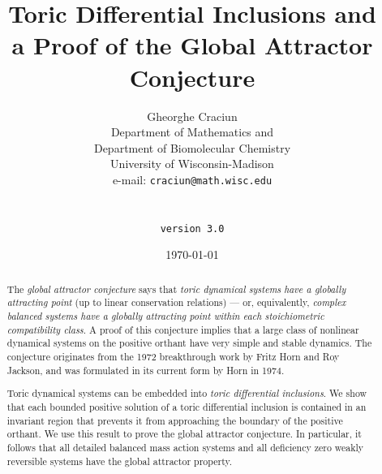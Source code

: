 \documentclass[12pt,letterpaper]{article}
\begin{document}
\title{Toric Differential Inclusions and \\ a Proof of the Global Attractor Conjecture}


\author{
Gheorghe Craciun\\ 
Department of Mathematics and \\ 
Department of Biomolecular Chemistry\\
University of Wisconsin-Madison\\
e-mail: \texttt{craciun@math.wisc.edu}\\
\\
\\
{\tt version 3.0}
}

\date{\today}


\maketitle


\begin{abstract}
\noindent The  {\it global attractor conjecture} says that {\em toric dynamical systems} 
{\em have a globally attracting point} (up to linear conservation relations)
 --- or, equivalently, {\em complex balanced systems have a globally attracting point within each stoichiometric compatibility class}.  
%
A proof of this conjecture implies that a large class of nonlinear dynamical systems on the positive orthant have very simple and stable dynamics. The conjecture originates from the 1972 breakthrough work by Fritz Horn and Roy Jackson, and was  formulated in its current  form by Horn in 1974.

Toric dynamical systems can be embedded into  {\it toric differential inclusions}. We show that each bounded positive solution of a toric differential inclusion is contained in an invariant region that prevents it from approaching the boundary of the positive orthant. %
We use this result to prove the global attractor conjecture. 
 In particular, it  follows that all detailed balanced mass action systems and all deficiency zero weakly reversible systems have the global attractor property.
\end{abstract}
\end{document}
